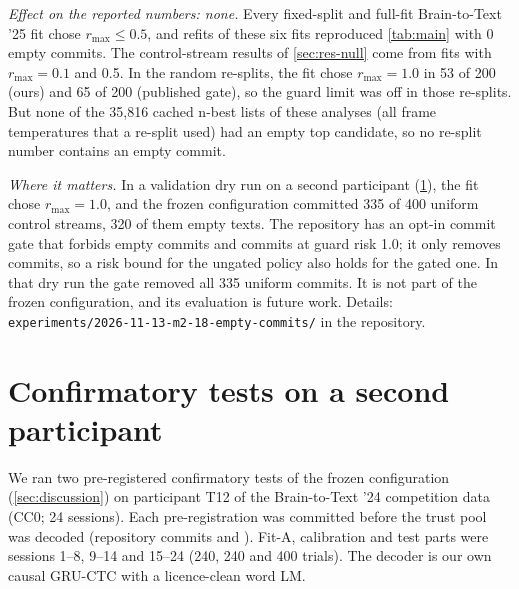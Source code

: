 \emph{Effect on the reported numbers: none.} Every fixed-split and full-fit Brain-to-Text '25 fit chose $r_{\max} \le 0.5$, and refits of these six fits reproduced \cref{tab:main} with 0 empty commits. The control-stream results of \cref{sec:res-null} come from fits with $r_{\max} = 0.1$ and 0.5. In the random re-splits, the fit chose $r_{\max} = 1.0$ in 53 of 200 (ours) and 65 of 200 (published gate), so the guard limit was off in those re-splits. But none of the 35,816 cached n-best lists of these analyses (all frame temperatures that a re-split used) had an empty top candidate, so no re-split number contains an empty commit.

\emph{Where it matters.} In a validation dry run on a second participant (\cref{app:t12}), the fit chose $r_{\max} = 1.0$, and the frozen configuration committed 335 of 400 uniform control streams, 320 of them empty texts. The repository has an opt-in commit gate that forbids empty commits and commits at guard risk 1.0; it only removes commits, so a risk bound for the ungated policy also holds for the gated one. In that dry run the gate removed all 335 uniform commits. It is not part of the frozen configuration, and its evaluation is future work. Details: \nolinkurl{experiments/2026-11-13-m2-18-empty-commits/} in the repository.

\section{Confirmatory tests on a second participant}
\label{app:t12}

We ran two pre-registered confirmatory tests of the frozen configuration (\cref{sec:discussion}) on participant T12 of the Brain-to-Text '24 competition data \citep{willett2023speech} (CC0; 24 sessions). Each pre-registration was committed before the trust pool was decoded (repository commits  and ). Fit-A, calibration and test parts were sessions 1--8, 9--14 and 15--24 (240, 240 and 400 trials). The decoder is our own causal GRU-CTC with a licence-clean word LM.

